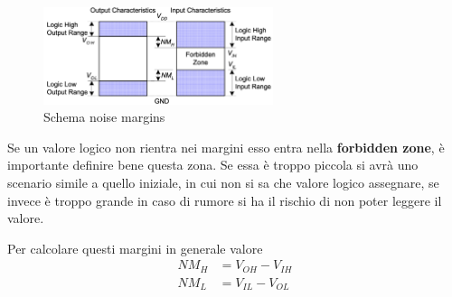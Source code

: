\documentclass[../main.tex]{subfiles}
\begin{document}
\begin{figure}[h]
    \centering
    \includegraphics[width=0.6\textwidth]{images/noiseMargin.png}
    \caption{Schema noise margins}
\end{figure}
Se un valore logico non rientra nei margini esso entra nella \textbf{forbidden zone}, è importante definire bene questa zona. 
Se essa è troppo piccola si avrà uno scenario simile a quello iniziale, in cui non si sa che valore logico assegnare, se invece
è troppo grande in caso di rumore si ha il rischio di non poter leggere il valore.

Per calcolare questi margini in generale valore
\begin{align*}
    NM_H &= V_{OH} - V_{IH} \\
    NM_L &= V_{IL} - V_{OL}
\end{align*}
\end{document}
